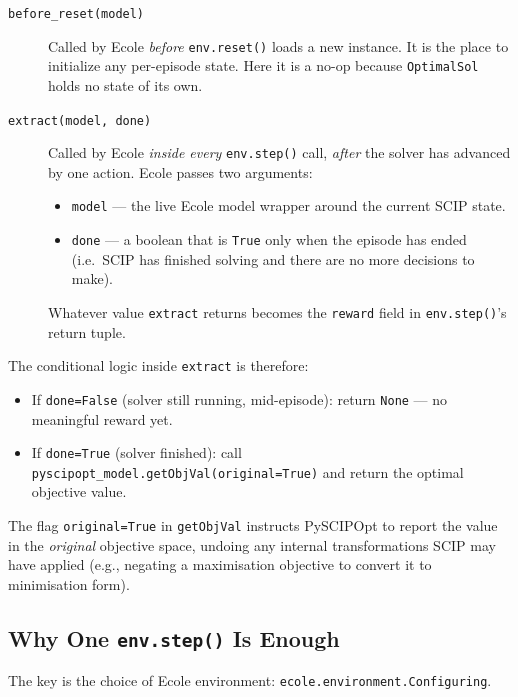 \begin{description}
    \item[\texttt{before\_reset(model)}]
        Called by Ecole \emph{before} \texttt{env.reset()} loads a new instance. It is the place to initialize any per-episode state. Here it is a no-op because \texttt{OptimalSol} holds no state of its own.

    \item[\texttt{extract(model, done)}]
        Called by Ecole \emph{inside every} \texttt{env.step()} call, \emph{after} the solver has advanced by one action. Ecole passes two arguments:
        \begin{itemize}
            \item \texttt{model} --- the live Ecole model wrapper around the current SCIP state.
            \item \texttt{done} --- a boolean that is \texttt{True} only when the episode has ended (i.e.\ SCIP has finished solving and there are no more decisions to make).
        \end{itemize}
        Whatever value \texttt{extract} returns becomes the \texttt{reward} field in \texttt{env.step()}'s return tuple.
\end{description}

The conditional logic inside \texttt{extract} is therefore:
\begin{itemize}
    \item If \texttt{done=False} (solver still running, mid-episode): return \texttt{None} --- no meaningful reward yet.
    \item If \texttt{done=True} (solver finished): call \texttt{pyscipopt\_model.getObjVal(original=True)} and return the optimal objective value.
\end{itemize}

The flag \texttt{original=True} in \texttt{getObjVal} instructs PySCIPOpt to report the value in the \emph{original} objective space, undoing any internal transformations SCIP may have applied (e.g., negating a maximisation objective to convert it to minimisation form).

\subsection{Why One \texttt{env.step()} Is Enough}

The key is the choice of Ecole environment: \texttt{ecole.environment.Configuring}.

